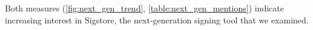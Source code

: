 \documentclass{IEEEcsmagTechrxiv}
\begin{document}
Both measures (\cref{fig:next_gen_trend}, \cref{table:next_gen_mentions}) indicate increasing interest in Sigstore, the next-generation signing tool that we examined.

\end{document}
